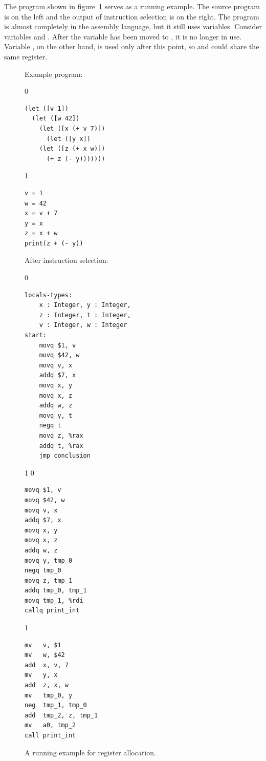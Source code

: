 \documentclass[7x10]{TimesAPriori_MIT}%
\def\racketEd{0}
\def\pythonEd{1}
\def\edition{1}
\def\xeightysixEd{0}
\def\riscvEd{1}
\def\architecture{1}
\newcommand{\pythonColor}[0]{}
\numberwithin{theorem}{chapter}
\numberwithin{definition}{chapter}
\numberwithin{equation}{chapter}
\begin{document}
The program shown in figure~\ref{fig:reg-eg} serves as a running
example. The source program is on the left and the output of
instruction selection
is on the right. The program is almost
completely in the {\ArchName} assembly language, but it still uses variables.
Consider variables  and .  After the variable 
has been moved to , it is no longer in use.  Variable , on
the other hand, is used only after this point, so  and
 could share the same register.

\begin{figure}
\begin{tcolorbox}[colback=white]
\begin{minipage}{0.45\textwidth}
Example \LangVar{} program:
{\if\edition\racketEd
\begin{lstlisting}
(let ([v 1])
  (let ([w 42])
    (let ([x (+ v 7)])
      (let ([y x])
	(let ([z (+ x w)])
	  (+ z (- y)))))))
\end{lstlisting}
\fi}
{\if\edition\pythonEd\pythonColor
\begin{lstlisting}
v = 1
w = 42
x = v + 7
y = x
z = x + w
print(z + (- y))
\end{lstlisting}
\fi}
\end{minipage}
\begin{minipage}{0.45\textwidth}
After instruction selection:
{\if\edition\racketEd
\begin{lstlisting}
locals-types:
    x : Integer, y : Integer,
    z : Integer, t : Integer,
    v : Integer, w : Integer
start:
    movq $1, v
    movq $42, w
    movq v, x
    addq $7, x
    movq x, y
    movq x, z
    addq w, z
    movq y, t
    negq t
    movq z, %rax
    addq t, %rax
    jmp conclusion
\end{lstlisting}
\fi}
{\if\edition\pythonEd\pythonColor
\if\architecture\xeightysixEd
\begin{lstlisting}
movq $1, v
movq $42, w
movq v, x
addq $7, x
movq x, y
movq x, z
addq w, z
movq y, tmp_0
negq tmp_0
movq z, tmp_1
addq tmp_0, tmp_1
movq tmp_1, %rdi
callq print_int
\end{lstlisting}
\fi
\if\architecture\riscvEd
\begin{lstlisting}
mv   v, $1
mv   w, $42
add  x, v, 7
mv   y, x
add  z, x, w
mv   tmp_0, y
neg  tmp_1, tmp_0
add  tmp_2, z, tmp_1
mv   a0, tmp_2
call print_int
\end{lstlisting}
\fi
\fi}
\end{minipage}
\end{tcolorbox}
\caption{A running example for register allocation.}
\label{fig:reg-eg}
\end{figure}
\end{document}
